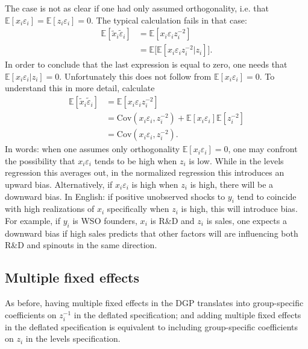 \documentclass[11pt,english]{article}
\theoremstyle{definition}
\begin{document}
The case is not as clear if one had only assumed orthogonality, i.e. that $\mathbb{E}[ x_i \varepsilon_i ] = \mathbb{E} [ z_i \varepsilon_i] = 0$. The typical calculation fails in that case:
\begin{align}
	\mathbb{E}[\tilde{x}_i \tilde{\varepsilon}_i ] &= \mathbb{E} [ x_i \varepsilon_i z_i^{-2}] \nonumber \\
	&= \mathbb{E} \Big[ \mathbb{E} [ x_i \varepsilon_i z_i^{-2} | z_i] \Big]. \label{regression_consistency_onlyOrthogonal}
\end{align}
In order to conclude that the last expression is equal to zero, one needs that $\mathbb{E}[x_i \varepsilon_i | z_i] = 0$. Unfortunately this does not follow from $\mathbb{E}[x_i \varepsilon_i] = 0$.
To understand this in more detail, calculate
\begin{align}
	\mathbb{E}[\tilde{x}_i \tilde{\varepsilon}_i ] &= \mathbb{E} [ x_i \varepsilon_i z_i^{-2}] \\ 
												   &= \mathrm{Cov}(x_i \varepsilon_i, z_i^{-2}) + \mathbb{E}[ x_i \varepsilon_i] \mathbb{E} [ z_i^{-2}] \\
												   &= \mathrm{Cov}(x_i \varepsilon_i, z_i^{-2}).
\end{align}
In words: when one assumes only orthogonality $\mathbb{E}[x_i \varepsilon_i] = 0$, one may confront the possibility that $x_i \varepsilon_i$ tends to be high when $z_i$ is low. While in the levels regression this averages out, in the normalized regression this introduces an upward bias. Alternatively, if $x_i \varepsilon_i$ is high when $z_i$ is high, there will be a downward bias. In English: if positive unobserved shocks to $y_i$ tend to coincide with high realizations of $x_i$ specifically when $z_i$ is high, this will introduce bias. For example, if $y_i$ is WSO founders, $x_i$ is R\&D and $z_i$ is sales, one expects a downward bias if high sales predicts that other factors will are influencing both R\&D and spinouts in the same direction.


\subsection{Multiple fixed effects}

As before, having multiple fixed effects in the DGP translates into group-specific coefficients on $z_i^{-1}$ in the deflated specification; and adding multiple fixed effects in the deflated specification is equivalent to including group-specific coefficients on $z_i$ in the levels specification.
\end{document}
